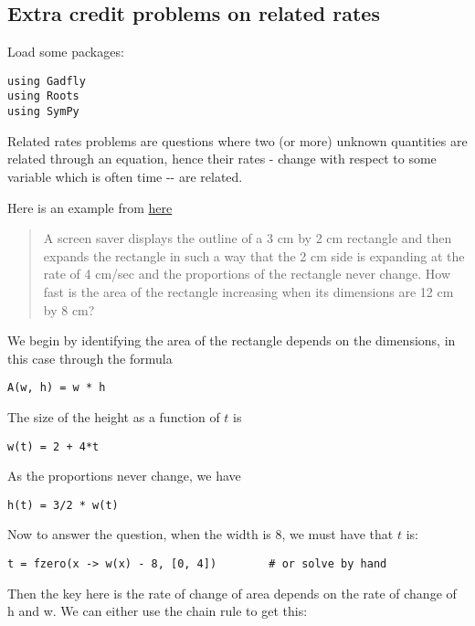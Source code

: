 \documentclass[12pt]{article}
\begin{document}
\subsection{Extra credit problems on related rates}

Load some packages:



\begin{verbatim}
using Gadfly
using Roots
using SymPy
\end{verbatim}
Related rates problems are questions where two (or more) unknown
quantities are related through an equation, hence their rates - change
with respect to some variable which is often time -{}- are related.

Here is an example from
\href{http://oregonstate.edu/instruct/mth251/cq/Stage9/Practice/ratesProblems.html}{here}

\begin{quote}
A screen saver displays the outline of a 3 cm by 2 cm rectangle and then
expands the rectangle in such a way that the 2 cm side is expanding at
the rate of 4 cm/sec and the proportions of the rectangle never change.
How fast is the area of the rectangle increasing when its dimensions are
12 cm by 8 cm?
\end{quote}

We begin by identifying the area of the rectangle depends on the
dimensions, in this case through the formula



\begin{verbatim}
A(w, h) = w * h
\end{verbatim}
The size of the height as a function of $t$ is



\begin{verbatim}
w(t) = 2 + 4*t
\end{verbatim}
As the proportions never change, we have



\begin{verbatim}
h(t) = 3/2 * w(t)
\end{verbatim}
Now to answer the question, when the width is 8, we must have that $t$
is:



\begin{verbatim}
t = fzero(x -> w(x) - 8, [0, 4])        # or solve by hand
\end{verbatim}
Then the key here is the rate of change of area depends on the rate of
change of h and w. We can either use the chain rule to get this:
\end{document}
